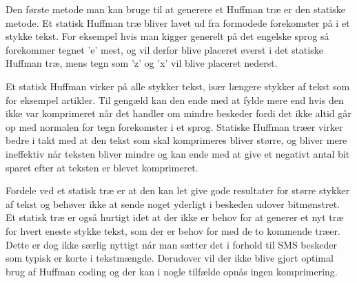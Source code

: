 Den første metode man kan bruge til at generere et Huffman træ er den statiske metode. Et statisk Huffman træ bliver lavet ud fra formodede forekomster på i et stykke tekst. For eksempel hvis man kigger generelt på det engelske sprog så forekommer tegnet ’e’ mest, og vil derfor blive placeret øverst i det statiske Huffman træ, mens tegn som ’z’ og ’x’ vil blive placeret nederst\cite{Hufftree_2}.

Et statisk Huffman virker på alle stykker tekst, især længere stykker af tekst som for eksempel artikler. Til gengæld kan den ende med at fylde mere end hvis den ikke var komprimeret når det handler om mindre beskeder fordi det ikke altid går op med normalen for tegn forekomster i et sprog. Statiske Huffman træer virker bedre i takt med at den tekst som skal komprimeres bliver større, og bliver mere ineffektiv når teksten bliver mindre og kan ende med at give et negativt antal bit sparet efter at teksten er blevet komprimeret. \cite{Hufftree_3}

Fordele ved et statisk træ er at den kan let give gode resultater for større stykker af tekst og behøver ikke at sende noget yderligt i beskeden udover bitmønstret. Et statisk træ er også hurtigt idet at der ikke er behov for at generer et nyt træ for hvert eneste stykke tekst, som der er behov for med de to kommende træer. Dette er dog ikke særlig nyttigt når man sætter det i forhold til SMS beskeder som typisk er korte i tekstmængde. Derudover vil der ikke blive gjort optimal brug af Huffman coding og der kan i nogle tilfælde opnås ingen komprimering.